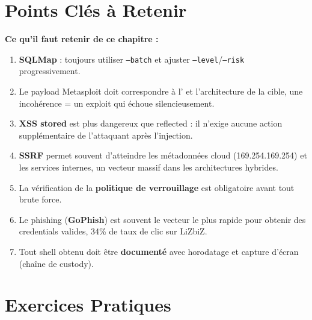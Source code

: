 \section*{Points Clés à Retenir}

\begin{boxinfo}
\textbf{Ce qu'il faut retenir de ce chapitre :}
\begin{enumerate}
    \item \textbf{SQLMap} : toujours utiliser \texttt{--batch} et ajuster
          \texttt{--level}/\texttt{--risk} progressivement.
    \item Le payload Metasploit doit correspondre à l' et
          l'architecture de la cible, une incohérence = un exploit
          qui échoue silencieusement.
    \item \textbf{XSS stored} est plus dangereux que reflected : il
          n'exige aucune action supplémentaire de l'attaquant après
          l'injection.
    \item \textbf{SSRF} permet souvent d'atteindre les métadonnées
          cloud (169.254.169.254) et les services internes, un vecteur
          massif dans les architectures hybrides.
    \item La vérification de la \textbf{politique de verrouillage} est
          obligatoire avant tout brute force.
    \item Le phishing (\textbf{GoPhish}) est souvent le vecteur le plus
          rapide pour obtenir des credentials valides, 34\% de taux de
          clic sur LiZbiZ.
    \item Tout shell obtenu doit être \textbf{documenté} avec horodatage
          et capture d'écran (chaîne de custody).
\end{enumerate}
\end{boxinfo}

\section*{Exercices Pratiques}

